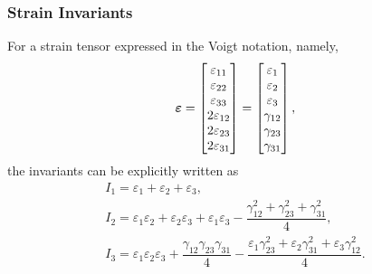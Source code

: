 \subsubsection{Strain Invariants}
For a strain tensor expressed in the Voigt notation, namely,
\begin{gather}
\bm{\varepsilon}=\begin{bmatrix}
\varepsilon_{11}\\\varepsilon_{22}\\\varepsilon_{33}\\2\varepsilon_{12}\\2\varepsilon_{23}\\2\varepsilon_{31}
\end{bmatrix}=\begin{bmatrix}
\varepsilon_{1}\\\varepsilon_{2}\\\varepsilon_{3}\\\gamma_{12}\\\gamma_{23}\\\gamma_{31}
\end{bmatrix},
\end{gather}
the invariants can be explicitly written as
\begin{gather}
I_1=\varepsilon_1+\varepsilon_2+\varepsilon_3,\\
I_2=\varepsilon_1\varepsilon_2+\varepsilon_2\varepsilon_3+\varepsilon_1\varepsilon_3-\dfrac{\gamma_{12}^2+\gamma_{23}^2+\gamma_{31}^2}{4},\\
I_3=\varepsilon_1\varepsilon_2\varepsilon_3+\dfrac{\gamma_{12}\gamma_{23}\gamma_{31}}{4}-\dfrac{\varepsilon_1\gamma_{23}^2+\varepsilon_2\gamma_{31}^2+\varepsilon_3\gamma_{12}^2}{4}.
\end{gather}
